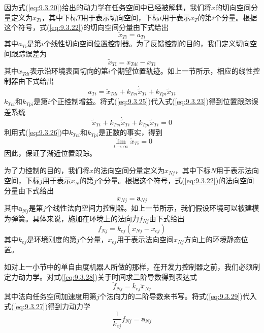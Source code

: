 \documentclass[12pt,a4paper]{ctexart}
\begin{document}
因为式(\ref{eq:9.3.20})给出的动力学在任务空间中已经被解耦，我们将$x$的切向空间分量定义为$x_{Ti}$，其中下标$T$用于表示切向空间，下标$i$用于表示$x_T$的第$i$个分量。根据这个符号，式(\ref{eq:9.3.22})的切向空间分量由下式给出
\begin{equation}\label{eq:9.3.23}
\ddot{x}_{Ti} = a_{Ti}
\end{equation}
其中$a_{Ti}$是第$i$个线性切向空间位置控制器。为了反馈控制的目的，我们定义切向空间跟踪误差为
\begin{equation}\label{eq:9.3.24}
\tilde{x}_{Ti} = x_{Tdi} - x_{Ti}
\end{equation}
其中$x_{Tdi}$表示沿环境表面切向的第$i$个期望位置轨迹。如上一节所示，相应的线性控制器由下式给出
\begin{equation}\label{eq:9.3.25}
a_{Ti} = \ddot{x}_{Tdi} + k_{Tvi}\dot{\tilde{x}}_{Ti} + k_{Tpi}\tilde{x}_{Ti}
\end{equation}
$k_{Tvi}$和$k_{Tpi}$是第$i$个正控制增益。将式(\ref{eq:9.3.25})代入式(\ref{eq:9.3.23})得到位置跟踪误差系统
\begin{equation}\label{eq:9.3.26}
\ddot{\tilde{x}}_{Ti} + k_{Tvi}\dot{\tilde{x}}_{Ti} + k_{Tpi}\tilde{x}_{Ti} = 0
\end{equation}
利用式(\ref{eq:9.3.26})中$k_{Tvi}$和$k_{Tpi}$是正数的事实，得到
\[
\lim_{t \to \infty} \tilde{x}_{Ti} = 0
\]
因此，保证了渐近位置跟踪。

为了力控制的目的，我们将$x$的法向空间分量定义为$x_{Nj}$，其中下标$N$用于表示法向空间，下标$j$用于表示$x_N$的第$j$个分量。根据这个符号，式(\ref{eq:9.3.22})的法向空间分量由下式给出
\begin{equation}\label{eq:9.3.27}
\ddot{x}_{Nj} = \mathbf{a}_{Nj}
\end{equation}
其中$\mathbf{a}_{Nj}$是第$j$个线性法向空间力控制器。如上一节所示，我们假设环境可以被建模为弹簧。具体来说，施加在环境上的法向力$f_{Nj}$由下式给出
\begin{equation}\label{eq:9.3.28}
f_{Nj} = k_{ej}(x_{Nj} - x_{ej})
\end{equation}
其中$k_{ej}$是环境刚度的第$j$个分量，$x_{ej}$用于表示法向空间$x_{Nj}$方向上的环境静态位置。

如对上一小节中的单自由度机器人所做的那样，在开发力控制器之前，我们必须制定力动力学。对式(\ref{eq:9.3.28})关于时间求二阶导数得到表达式
\begin{equation}\label{eq:9.3.29}
\ddot{f}_{Nj} = k_{ej}\ddot{x}_{Nj}
\end{equation}
其中法向任务空间加速度用第$j$个法向力的二阶导数来书写。将式(\ref{eq:9.3.29})代入式(\ref{eq:9.3.27})得到力动力学
\begin{equation}\label{eq:9.3.30}
\frac{1}{k_{ej}}\ddot{f}_{Nj} = \mathbf{a}_{Nj}
\end{equation}
\end{document}
